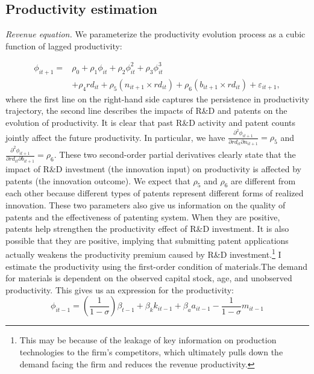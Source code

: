 \documentclass[11pt]{article}
\begin{document}
\subsection{Productivity estimation}

\textit{Revenue equation.}
We parameterize the productivity evolution process as a cubic function of lagged productivity:

\begin{align} \label{mk}
\phi_{it+1} =& \rho_{0}+\rho_{1}\phi_{it}+\rho_{2}\phi_{it}^{2}+\rho_{3}\phi_{it}^{3} \\
             & +\rho_{4}rd_{it}+\rho_{5}\left(n_{it+1}\times rd_{it} \right)+\rho_{6}\left(b_{it+1}\times rd_{it}\right)+\varepsilon_{it+1}, \nonumber 
\end{align}
where the first line on the right-hand side captures the persistence
in productivity trajectory, the second line describes the impacts of R\&D and
patents on the evolution of productivity. It is clear that past R\&D activity and patent counts jointly affect the future productivity. In particular, we have $\frac{\partial^2 \phi_{it+1}}{\partial rd_{it}\partial n_{it+1}}=\rho_5$ and $\frac{\partial^2 \phi_{it+1}}{\partial rd_{it}\partial b_{it+1}}=\rho_6$. These two second-order partial derivatives clearly state that the impact of R\&D investment (the innovation input) on productivity is affected by patents (the innovation outcome). We expect
that $\rho_{5}$ and $\rho_{6}$ are different from each other because
different types of patents represent different forms of realized innovation. These two
parameters also give us information on the quality of patents and the effectiveness of patenting system. When they are positive, patents help strengthen the productivity effect of R\&D investment. It is also possible that they are positive, implying that submitting patent applications actually weakens the productivity premium caused by R\&D investment.\footnote{This may be because of the leakage of key information on production technologies to the firm's competitors, which ultimately pulls down the demand facing the firm and reduces the revenue productivity.} 
I estimate the productivity using the first-order condition of materials.The demand for materials is dependent on the observed capital stock, age, and unobserved productivity. This gives us an expression for the productivity:
\begin{equation}
\phi_{it-1}=\left(\frac{1}{1-\sigma}\right)\beta_{t-1}+\beta_{k}k_{it-1}+\beta_{a}a_{it-1}-\frac{1}{1-\sigma}m_{it-1}\label{productivity}
\end{equation}
\end{document}
